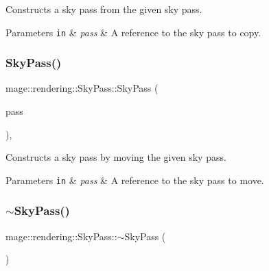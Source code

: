 Constructs a sky pass from the given sky pass.


\begin{DoxyParams}[1]{Parameters}
\mbox{\tt in}  & {\em pass} & A reference to the sky pass to copy. \\
\hline
\end{DoxyParams}
\hypertarget{classmage_1_1rendering_1_1_sky_pass_a2d9489936058c463743bd437fb0cbb3e}{}\label{classmage_1_1rendering_1_1_sky_pass_a2d9489936058c463743bd437fb0cbb3e} 
\subsubsection{\texorpdfstring{Sky\+Pass()}{SkyPass()}\hspace{0.1cm}{\footnotesize\ttfamily [3/3]}}
{\footnotesize\ttfamily mage\+::rendering\+::\+Sky\+Pass\+::\+Sky\+Pass (\begin{DoxyParamCaption}\item[{\hyperlink{classmage_1_1rendering_1_1_sky_pass}{Sky\+Pass} \&\&}]{pass }\end{DoxyParamCaption})\hspace{0.3cm}{\ttfamily [default]}, {\ttfamily [noexcept]}}

Constructs a sky pass by moving the given sky pass.


\begin{DoxyParams}[1]{Parameters}
\mbox{\tt in}  & {\em pass} & A reference to the sky pass to move. \\
\hline
\end{DoxyParams}
\hypertarget{classmage_1_1rendering_1_1_sky_pass_a99473ca11c0c25ab0608a3f93cf30aa6}{}\label{classmage_1_1rendering_1_1_sky_pass_a99473ca11c0c25ab0608a3f93cf30aa6} 
\subsubsection{\texorpdfstring{$\sim$\+Sky\+Pass()}{~SkyPass()}}
{\footnotesize\ttfamily mage\+::rendering\+::\+Sky\+Pass\+::$\sim$\+Sky\+Pass (\begin{DoxyParamCaption}{ }\end{DoxyParamCaption})\hspace{0.3cm}{\ttfamily [default]}}

